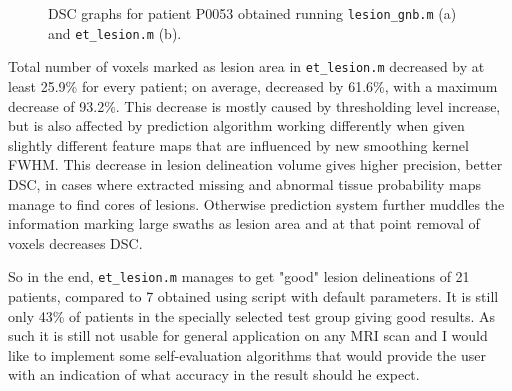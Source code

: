 \documentclass[12pt]{article}
\begin{document}
\begin{figure}[!htb]
\centering
{}

\caption{DSC graphs for patient P0053 obtained running \texttt{lesion\_gnb.m} (a) and \texttt{et\_lesion.m} (b).}
\label{fig:etvsgnb0053}
\end{figure}

Total number of voxels marked as lesion area in \texttt{et\_lesion.m} decreased by at least 25.9\% for every patient; on average, decreased by 61.6\%, with a maximum decrease of 93.2\%. This decrease is mostly caused by thresholding level increase, but is also affected by prediction algorithm working differently when given slightly different feature maps that are influenced by new smoothing kernel FWHM. This decrease in lesion delineation volume gives higher precision, better DSC, in cases where extracted missing and abnormal tissue probability maps manage to find cores of lesions. Otherwise prediction system further muddles the information marking large swaths as lesion area and at that point removal of voxels decreases DSC.

So in the end, \texttt{et\_lesion.m} manages to get "good" \cite{griffis2016voxel} lesion delineations of 21 patients, compared to 7 obtained using script with default parameters. It is still only 43\% of patients in the specially selected test group giving good results. As such it is still not usable for general application on any MRI scan and I would like to implement some self-evaluation algorithms that would provide the user with an indication of what accuracy in the result should he expect.
\end{document}
